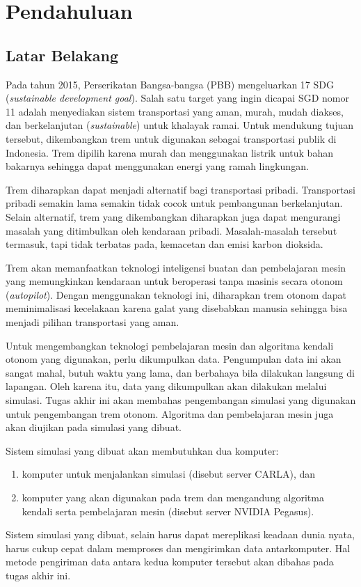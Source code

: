 \chapter{Pendahuluan}

\section{Latar Belakang}

Pada tahun 2015, Perserikatan Bangsa-bangsa (PBB) mengeluarkan 17 SDG
(\textit{sustainable development goal}). Salah satu target yang ingin dicapai
SGD nomor 11 adalah menyediakan sistem transportasi yang aman, murah, mudah
diakses, dan berkelanjutan (\textit{sustainable}) untuk khalayak ramai. Untuk
mendukung tujuan tersebut, dikembangkan trem untuk digunakan sebagai
transportasi publik di Indonesia. Trem dipilih karena murah dan menggunakan
listrik untuk bahan bakarnya sehingga dapat menggunakan energi yang ramah
lingkungan.

Trem diharapkan dapat menjadi alternatif bagi transportasi pribadi. Transportasi
pribadi semakin lama semakin tidak cocok untuk pembangunan berkelanjutan. Selain
alternatif, trem yang dikembangkan diharapkan juga dapat mengurangi masalah yang
ditimbulkan oleh kendaraan pribadi. Masalah-masalah tersebut termasuk, tapi
tidak terbatas pada, kemacetan dan emisi karbon dioksida.

Trem akan memanfaatkan teknologi inteligensi buatan dan pembelajaran mesin yang
memungkinkan kendaraan untuk beroperasi tanpa masinis secara otonom
(\textit{autopilot}). Dengan menggunakan teknologi ini, diharapkan trem otonom
dapat meminimalisasi kecelakaan karena galat yang disebabkan manusia sehingga
bisa menjadi pilihan transportasi yang aman.

Untuk mengembangkan teknologi pembelajaran mesin dan algoritma kendali
o\-to\-nom yang digunakan, perlu dikumpulkan data. Pengumpulan data ini akan
sangat mahal, butuh waktu yang lama, dan berbahaya bila dilakukan langsung di
lapangan. Oleh karena itu, data yang dikumpulkan akan dilakukan melalui
simulasi. Tugas akhir ini akan membahas pengembangan simulasi yang digunakan
untuk pengembangan trem otonom. Algoritma dan pembelajaran mesin juga akan
diujikan pada simulasi yang dibuat.

Sistem simulasi yang dibuat akan membutuhkan dua komputer:
\begin{enumerate}
	\item komputer untuk menjalankan simulasi (disebut server CARLA), dan
	\item komputer yang akan digunakan pada trem dan mengandung algoritma
	      kendali serta pembelajaran mesin (disebut server NVIDIA Pegasus).
\end{enumerate}
Sistem simulasi yang dibuat, selain harus dapat mereplikasi keadaan dunia nyata,
harus cukup cepat dalam memproses dan mengirimkan data antarkomputer. Hal metode
pengiriman data antara kedua komputer tersebut akan dibahas pada tugas akhir
ini.

